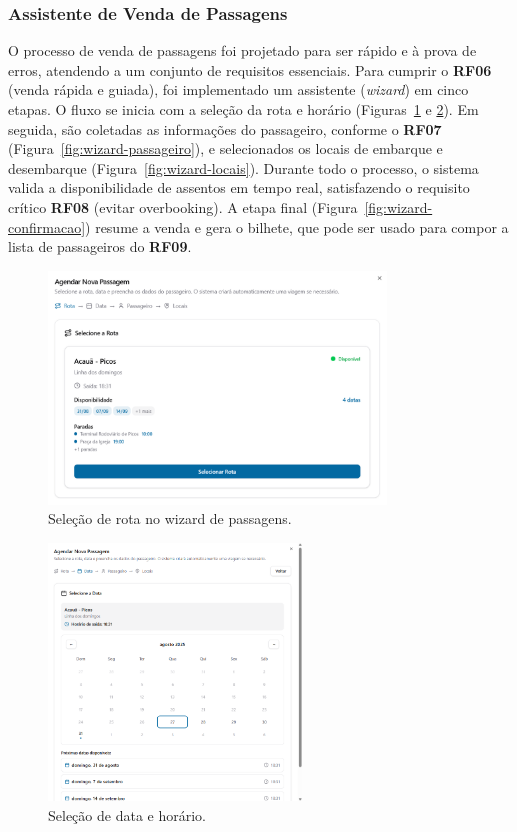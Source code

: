 \subsubsection{Assistente de Venda de Passagens}
O processo de venda de passagens foi projetado para ser rápido e à prova de erros, atendendo a um conjunto de requisitos essenciais. Para cumprir o \textbf{RF06} (venda rápida e guiada), foi implementado um assistente (\textit{wizard}) em cinco etapas. O fluxo se inicia com a seleção da rota e horário (Figuras~\ref{fig:wizard-rota} e \ref{fig:wizard-data}). Em seguida, são coletadas as informações do passageiro, conforme o \textbf{RF07} (Figura~\ref{fig:wizard-passageiro}), e selecionados os locais de embarque e desembarque (Figura~\ref{fig:wizard-locais}). Durante todo o processo, o sistema valida a disponibilidade de assentos em tempo real, satisfazendo o requisito crítico \textbf{RF08} (evitar overbooking). A etapa final (Figura~\ref{fig:wizard-confirmacao}) resume a venda e gera o bilhete, que pode ser usado para compor a lista de passageiros do \textbf{RF09}.

\begin{figure}[H]
 \centering
 \includegraphics[width=0.8\textwidth]{imagens/wizard-rota.png}
 \caption{Seleção de rota no wizard de passagens.}
 \label{fig:wizard-rota}
\end{figure}

\begin{figure}[H]
 \centering
 \includegraphics[width=0.6\textwidth]{imagens/wizard-data.png}
 \caption{Seleção de data e horário.}
 \label{fig:wizard-data}
\end{figure}


